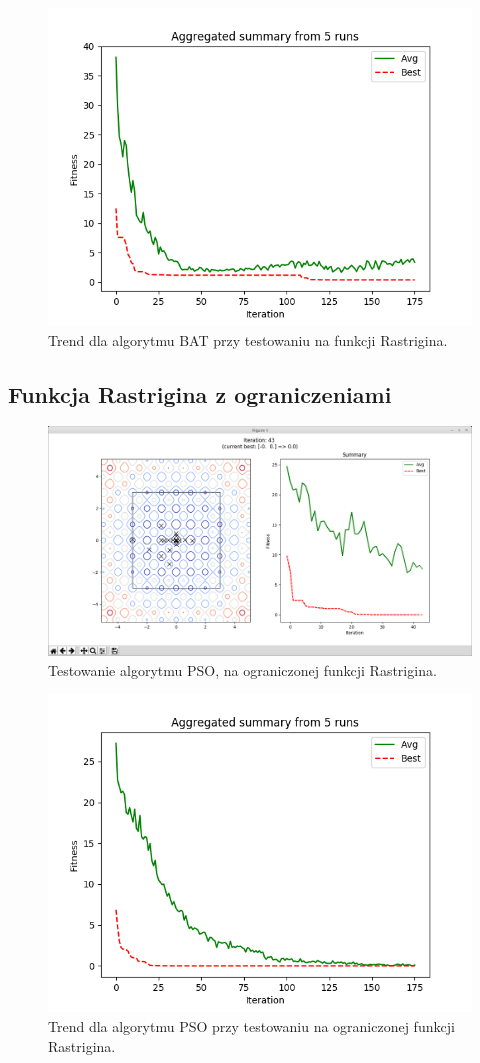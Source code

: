 \begin{figure}[H]
	\centering
	\includegraphics[width=0.7\linewidth]{analysis/rastrigin/bat_rastrigin/bat_rastrigin}
	\caption{Trend dla algorytmu BAT przy testowaniu na funkcji Rastrigina.}
	\label{fig:bat_rastrigin}
\end{figure}


\subsection{Funkcja Rastrigina z ograniczeniami}

\begin{figure}[H]
	\centering
	\includegraphics[width=0.7\linewidth]{imgs/program_limited_rastrigin}
	\caption{Testowanie algorytmu PSO, na ograniczonej funkcji Rastrigina.}
	\label{fig:program_limited_rastrigin}
\end{figure}

\begin{figure}[H]
	\centering
	\includegraphics[width=0.7\linewidth]{analysis/limited_rastrigin/pso_limited_rastrigin/pso_limited_rastrigin}
	\caption{Trend dla algorytmu PSO przy testowaniu na ograniczonej funkcji Rastrigina.}
	\label{fig:pso_limited_rastrigin}
\end{figure}


